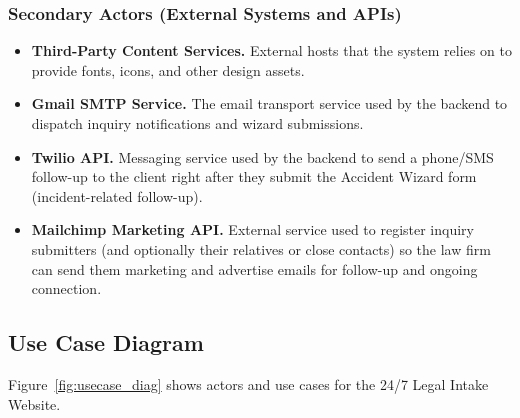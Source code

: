 \documentclass{article}
\begin{document}
\subsubsection{Secondary Actors (External Systems and APIs)}
\begin{itemize}
  \item \textbf{Third-Party Content Services.} External hosts that the system relies on to provide fonts, icons, and other design assets.
  \item \textbf{Gmail SMTP Service.} The email transport service used by the backend to dispatch inquiry notifications and wizard submissions.
  \item \textbf{Twilio API.} Messaging service used by the backend to send a phone/SMS follow-up to the client right after they submit the Accident Wizard form (incident-related follow-up).
  \item \textbf{Mailchimp Marketing API.} External service used to register inquiry submitters (and optionally their relatives or close contacts) so the law firm can send them marketing and advertise emails for follow-up and ongoing connection.
\end{itemize}




\newpage
\subsection{Use Case Diagram}\label{ss:usecasediag}
Figure~\ref{fig:usecase_diag} shows actors and use cases for the 24/7 Legal Intake Website.
\end{document}
